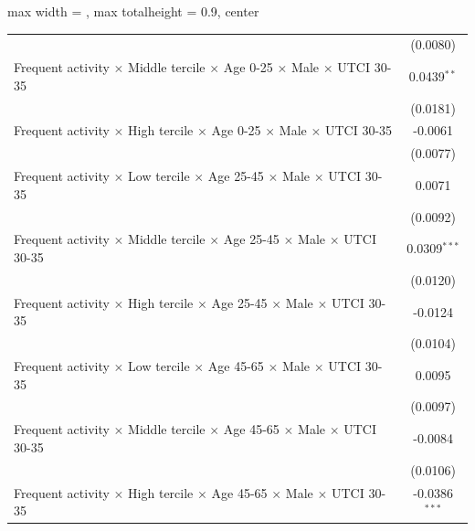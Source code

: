 \begin{table}[htbp]
\begin{adjustbox}{max width = \textwidth, max totalheight = 0.9\textheight, center}
\begin{tabular}{lc}
                                                                                                               & (0.0080)\\   
         Frequent activity $\times$ Middle tercile $\times$ Age 0-25 $\times$ Male $\times$ UTCI 30-35         & 0.0439$^{**}$\\   
                                                                                                               & (0.0181)\\   
         Frequent activity $\times$ High tercile $\times$ Age 0-25 $\times$ Male $\times$ UTCI 30-35           & -0.0061\\   
                                                                                                               & (0.0077)\\   
         Frequent activity $\times$ Low tercile $\times$ Age 25-45 $\times$ Male $\times$ UTCI 30-35           & 0.0071\\   
                                                                                                               & (0.0092)\\   
         Frequent activity $\times$ Middle tercile $\times$ Age 25-45 $\times$ Male $\times$ UTCI 30-35        & 0.0309$^{***}$\\   
                                                                                                               & (0.0120)\\   
         Frequent activity $\times$ High tercile $\times$ Age 25-45 $\times$ Male $\times$ UTCI 30-35          & -0.0124\\   
                                                                                                               & (0.0104)\\   
         Frequent activity $\times$ Low tercile $\times$ Age 45-65 $\times$ Male $\times$ UTCI 30-35           & 0.0095\\   
                                                                                                               & (0.0097)\\   
         Frequent activity $\times$ Middle tercile $\times$ Age 45-65 $\times$ Male $\times$ UTCI 30-35        & -0.0084\\   
                                                                                                               & (0.0106)\\   
         Frequent activity $\times$ High tercile $\times$ Age 45-65 $\times$ Male $\times$ UTCI 30-35          & -0.0386$^{***}$\\   

\end{tabular}
\end{adjustbox}
\end{table}
